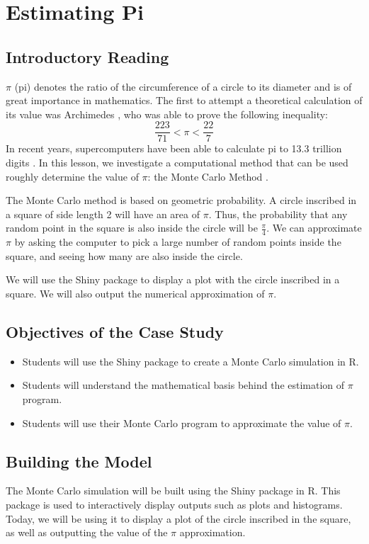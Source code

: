 \chapter{Estimating Pi}
\section{Introductory Reading}
$\pi$ (pi) denotes the ratio of the circumference of a circle to its diameter and is of great importance in mathematics.
The first to attempt a theoretical calculation of its value was Archimedes \cite{smoller}, who was able to prove the following inequality:
\[
\frac{223}{71} < \pi < \frac{22}{7}
\]
In recent years, supercomputers have been able to calculate pi to 13.3 trillion digits \cite{yee}.
In this lesson, we investigate a computational method that can be used roughly determine the value of $\pi$: the Monte Carlo Method \cite{andersson}.

\noindent 
The Monte Carlo method is based on geometric probability.
A circle inscribed in a square of side length 2 will have an area of $\pi$.
Thus, the probability that any random point in the square is also inside the circle will be $\frac{\pi}{4}$.
We can approximate $\pi$ by asking the computer to pick a large number of random points inside the square, and seeing how many are also inside the circle.

\noindent 
We will use the Shiny package to display a plot with the circle inscribed in a square.
We will also output the numerical approximation of $\pi$.

\section{Objectives of the Case Study}
\begin{itemize}
\item
Students will use the Shiny package to create a Monte Carlo simulation in R.
\item
Students will understand the mathematical basis behind the estimation of $\pi$ program.
\item
Students will use their Monte Carlo program to approximate the value of $\pi$.
\end{itemize}
\section{Building the Model}

The Monte Carlo simulation will be built using the Shiny package in R.
This package is used to interactively display outputs such as plots and histograms.
Today, we will be using it to display a plot of the circle inscribed in the square, as well as outputting the value of the $\pi$ approximation.


